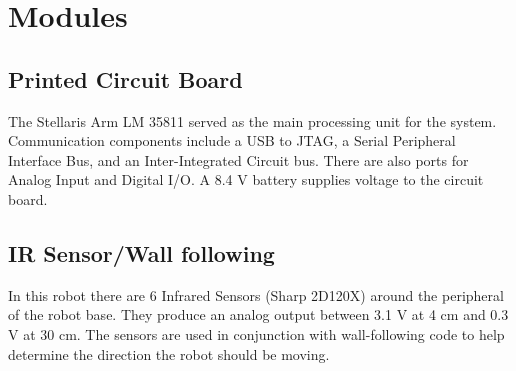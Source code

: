 \documentclass[12pt]{article}
\begin{document}
		
		
\section{Modules}

\subsection{Printed Circuit Board}
The Stellaris Arm LM 35811 served as the main processing unit for the system. Communication components include a USB to JTAG, a Serial Peripheral Interface Bus, and an Inter-Integrated Circuit bus. There are also ports for Analog Input and Digital I/O. A 8.4 V battery supplies voltage to the circuit board. 





\subsection{IR Sensor/Wall following}
In this robot there are 6 Infrared Sensors (Sharp 2D120X) around the peripheral of the robot base. They produce an analog output between 3.1 V at 4 cm and 0.3 V at 30 cm. The sensors are used in conjunction with wall-following code to help determine the direction the robot should be moving. 
\end{document}
